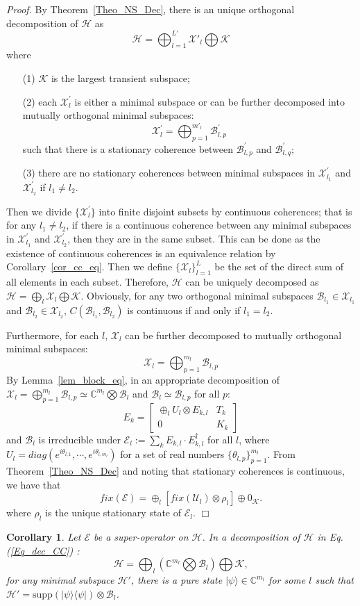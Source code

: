 \documentclass[journal]{IEEEtran}
\def\h{\ensuremath{\mathcal{H}}}
\def\u{\ensuremath{\mathcal{U}}}
\def\k{\ensuremath{\mathcal{K}}}
\def\u{\ensuremath{\mathcal{U}}}
\def\x{\ensuremath{\mathcal{X}}}
\def\b{\ensuremath{\mathcal{B}}}
\def\e{\ensuremath{\mathcal{E}}}
\def\k{\mathcal{K}}
\newtheorem{corollary}{Corollary}
\begin{document}
{\it Proof.} By Theorem~\ref{Theo_NS_Dec}, there is an unique  orthogonal decomposition of $\h$ as
  $$\h=\bigoplus_{l=1}^{L'}\x'_l\bigoplus \k$$
  where \begin{itemize}
    \item[(1)] $\k$ is the largest transient subspace;
    \item[(2)] each $\x_l^{'}$ is either a minimal subspace or can be further decomposed into mutually orthogonal minimal subspaces:
    $$\x_l^{'}=\bigoplus_{p=1}^{m'_l}\b_{l,p}^{'}$$%
    such that there is a stationary coherence between $\b_{l,p}^{'}$ and $\b_{l,q}^{'};$
    \item[(3)] there are no stationary coherences between minimal subspaces in $\x_{l_1}^{'}$ and $\x_{l_2}^{'}$ if $l_{1}\not =l_2.$
      \end{itemize}
Then we divide $\{\x_l^{'}\}$ into finite disjoint subsets by continuous coherences; that  is for any $l_1\not =l_2$, if there is a continuous coherence between any minimal subspaces in $\x_{l_1}^{'}$ and $\x_{l_2}^{'}$, then they are in the same subset. This can be done as the existence of continuous coherences is an equivalence relation by Corollary~\ref{cor_cc_eq}. Then we define $\{\x_l\}_{l=1}^{L}$ be the set of the direct sum  of all elements in each subset.  Therefore, $\h$ can be uniquely decomposed as $\h=\bigoplus_l\x_l\bigoplus \k.$ Obviously, for any two orthogonal  minimal subspaces $\b_{l_1}\in\x_{l_1}$ and $\b_{l_2}\in\x_{l_2}$, $C(\b_{l_1},\b_{l_2})$ is continuous if and only if $l_1=l_2.$

Furthermore, for each $l$, $\x_l$ can be further decomposed to mutually orthogonal minimal subspaces:
$$\x_l=\bigoplus_{p=1}^{m_l}\b_{l,p}$$
By Lemma~\ref{lem_block_eq}, %
in  an appropriate decomposition  of $\x_l=\bigoplus_{p=1}^{m_l}\b_{l,p}\simeq \mathbb{C}^{m_l}\bigotimes \b_l$ and $\b_l\simeq \b_{l,p}$ for all $p$:
$$E_k=\left[\begin{matrix}
  \oplus_l U_{l}\otimes E_{k,l} & T_k\\
0&K_k
\end{matrix}\right ]$$
and $\b_l$ is irreducible under $\e_{l}:=\sum_{k}E_{k,l}\cdot E_{k,l}^\dagger$  for all $l$, 
where $U_l=diag(e^{i\theta_{l,1}},\cdots,e^{i\theta_{l,m_l}})$ for a set of real numbers $\{\theta_{l,p}\}_{p=1}^{m_l}.$  From Theorem~\ref{Theo_NS_Dec} and noting that stationary coherences is continuous, we have that 
$$fix(\e)=\oplus_l[fix(\u_{l})\otimes \rho_l]\oplus 0_\k.$$ 
where $\rho_l$ is the unique stationary state of $\e_l.$ \hfill $\Box$
\begin{corollary}\label{Cor_mini}
  Let $\e$ be a super-operator  on $\h$. In a decomposition of $\h$ in Eq.(\ref{Eq_dec_CC}) :
$$\h=\bigoplus_l(\mathbb{C}^{m_l}\bigotimes \b_l)\bigoplus \k,$$ for any minimal subspace $\h'$, there is a pure state $|\psi\rangle\in \mathbb{C}^{m_l}$ for some $l$ such that $\h'=\textrm{supp}(|\psi\rangle\langle \psi|)\otimes \b_l$. 
\end{corollary}
\end{document}
